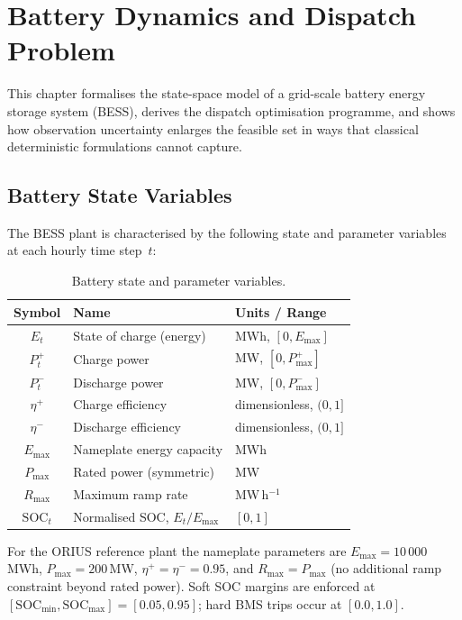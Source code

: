 \section{Battery Dynamics and Dispatch Problem}
\label{ch:battery-dynamics}

This chapter formalises the state-space model of a grid-scale battery energy
storage system (BESS), derives the dispatch optimisation programme, and
shows how observation uncertainty enlarges the feasible set in ways that
classical deterministic formulations cannot capture.

\subsection{Battery State Variables}

The BESS plant is characterised by the following state and parameter
variables at each hourly time step~$t$:

\begin{table}[ht]
\centering
\caption{Battery state and parameter variables.}
\label{tab:battery-vars}
\begin{tabular}{cll}
\toprule
\textbf{Symbol} & \textbf{Name} & \textbf{Units / Range} \\
\midrule
$E_t$          & State of charge (energy)      & MWh, $[0, E_{\max}]$ \\
$P_t^{+}$     & Charge power                  & MW,  $[0, P_{\max}^{+}]$ \\
$P_t^{-}$     & Discharge power               & MW,  $[0, P_{\max}^{-}]$ \\
$\eta^{+}$    & Charge efficiency              & dimensionless, $(0,1]$ \\
$\eta^{-}$    & Discharge efficiency           & dimensionless, $(0,1]$ \\
$E_{\max}$    & Nameplate energy capacity      & MWh \\
$P_{\max}$    & Rated power (symmetric)        & MW \\
$R_{\max}$    & Maximum ramp rate              & MW\,h$^{-1}$ \\
$\mathrm{SOC}_t$ & Normalised SOC, $E_t / E_{\max}$ & $[0, 1]$ \\
\bottomrule
\end{tabular}
\end{table}

For the ORIUS reference plant the nameplate parameters are
$E_{\max} = 10\,000$\,MWh, $P_{\max} = 200$\,MW, $\eta^{+} = \eta^{-} = 0.95$,
and $R_{\max} = P_{\max}$ (no additional ramp constraint beyond rated power).
Soft SOC margins are enforced at $[\mathrm{SOC}_{\min}, \mathrm{SOC}_{\max}]
= [0.05, 0.95]$; hard BMS trips occur at $[0.0, 1.0]$.


